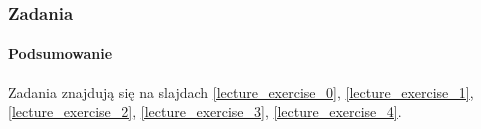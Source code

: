 \documentclass[aspectratio=169]{beamer}
\begin{document}
\begin{frame}
    \frametitle{Zadania}
    \framesubtitle{Podsumowanie}

    Zadania znajdują się na slajdach
    \ref{lecture_exercise_0},
    \ref{lecture_exercise_1},
    \ref{lecture_exercise_2},
    \ref{lecture_exercise_3},
    \ref{lecture_exercise_4}.
\end{frame}
\end{document}

